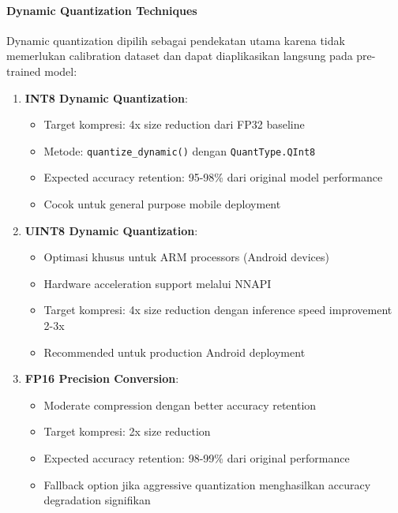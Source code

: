 \paragraph{Dynamic Quantization Techniques}
Dynamic quantization dipilih sebagai pendekatan utama karena tidak memerlukan calibration dataset dan dapat diaplikasikan langsung pada pre-trained model:

\begin{enumerate}
    \item \textbf{INT8 Dynamic Quantization}: 
    \begin{itemize}
        \item Target kompresi: 4x size reduction dari FP32 baseline
        \item Metode: \texttt{quantize\_dynamic()} dengan \texttt{QuantType.QInt8}
        \item Expected accuracy retention: 95-98\% dari original model performance
        \item Cocok untuk general purpose mobile deployment
    \end{itemize}
    
    \item \textbf{UINT8 Dynamic Quantization}: 
    \begin{itemize}
        \item Optimasi khusus untuk ARM processors (Android devices)
        \item Hardware acceleration support melalui NNAPI
        \item Target kompresi: 4x size reduction dengan inference speed improvement 2-3x
        \item Recommended untuk production Android deployment
    \end{itemize}
    
    \item \textbf{FP16 Precision Conversion}:
    \begin{itemize}
        \item Moderate compression dengan better accuracy retention
        \item Target kompresi: 2x size reduction
        \item Expected accuracy retention: 98-99\% dari original performance
        \item Fallback option jika aggressive quantization menghasilkan accuracy degradation signifikan
    \end{itemize}
\end{enumerate}

